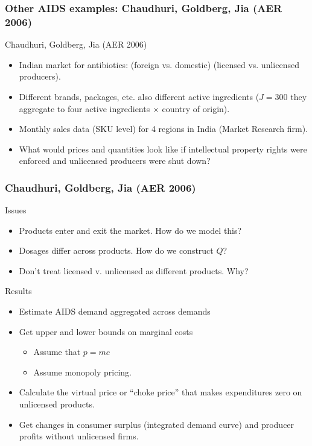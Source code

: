 \documentclass[aspectratio=169,11pt]{beamer}
\begin{document}
\begin{frame}
\frametitle{Other AIDS examples: Chaudhuri, Goldberg, Jia (AER 2006)}
 Chaudhuri, Goldberg, Jia (AER 2006)
\begin{itemize}
\item Indian market for antibiotics: (foreign vs. domestic) (licensed vs. unlicensed producers).
\item Different brands, packages, etc. also different active ingredients ($J=300$ they aggregate to four active ingredients $\times$ country of origin).
\item Monthly sales data (SKU level) for 4 regions in India (Market Research firm).
\item What would prices and quantities look like if intellectual property rights were enforced and unlicensed producers were shut down?
\end{itemize}
\end{frame}

\begin{frame}
\frametitle{Chaudhuri, Goldberg, Jia (AER 2006)}
Issues
 \begin{itemize}
\item Products enter and exit the market. How do we model this?
\item Dosages differ across products. How do we construct $Q$?
\item Don't treat licensed v. unlicensed as different products. Why?
\end{itemize}
Results
 \begin{itemize}
\item Estimate AIDS demand aggregated across demands
\item Get upper and lower bounds on marginal costs
\begin{itemize}
\item Assume that $p=mc$
\item Assume monopoly pricing.
\end{itemize}
\item Calculate the \alert{virtual price} or ``choke price'' that makes expenditures zero on unlicensed products.
\item Get changes in consumer surplus (integrated demand curve) and producer profits without unlicensed firms.
\end{itemize}
\end{frame}
\end{document}
